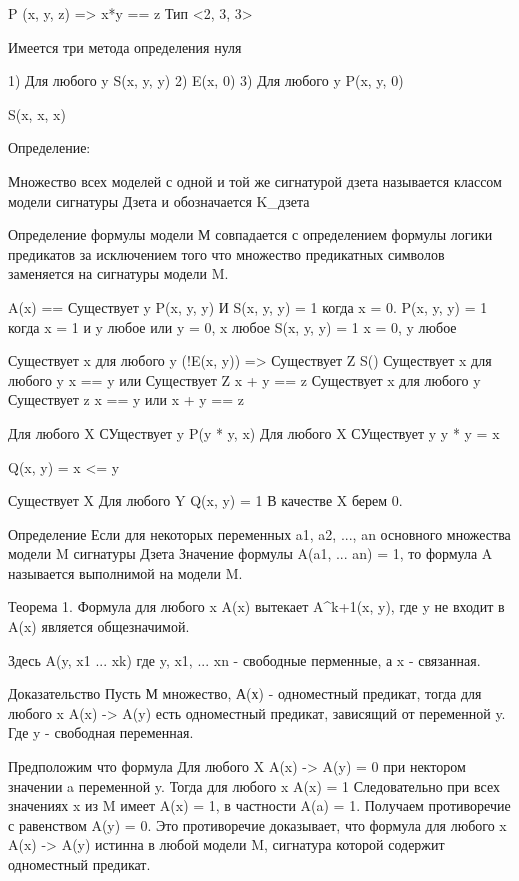 P (x, y, z) => x*y == z
 Тип <2, 3, 3>

 Имеется три метода определения нуля

 1) Для любого y S(x, y, y)
 2) E(x, 0)
 3) Для любого y P(x, y, 0)

 S(x, x, x)

 Определение:

 Множество всех моделей с одной и той же сигнатурой дзета называется классом модели сигнатуры Дзета и обозначается K_{дзета}

 Определение формулы модели М совпадается с определением формулы логики предикатов за исключением того что множество предикатных символов заменяется на сигнатуры модели M.

 A(x) == Существует y P(x, y, y) И S(x, y, y)
 = 1 когда x = 0.
 P(x, y, y) = 1 { когда x = 1 и y любое } или {y = 0, x любое}
 S(x, y, y) = 1 { x = 0, y любое }

 Существует x для любого y (!E(x, y)) => Существует Z S()
 Существует x для любого y x == y или Существует Z x + y == z
 Существует x для любого y Существует z x == y или x + y == z


 Для любого X СУществует y P(y * y, x)
 Для любого X СУществует y y * y = x

 Q(x, y) = x <= y

 Существует X Для любого Y Q(x, y) = 1 В качестве X берем 0.

 Определение
 Если для некоторых переменных a1, a2, ..., an основного множества модели M сигнатуры Дзета
 Значение формулы A(a1, ... an) = 1, то формула A называется выполнимой на модели M.

 Теорема 1. Формула для любого x A(x)
 вытекает A^k+1(x, y), где y не входит в A(x) является общезначимой.

 Здесь A(y, x1 ... xk) где y, x1, ... xn - свободные перменные, а x - связанная.

 Доказательство
 Пусть М множество, А(х) - одноместный предикат, тогда для любого x A(x) -> A(y) есть одноместный предикат, зависящий от переменной y.
 Где y - свободная переменная.

 Предположим что формула Для любого X A(x) -> A(y) = 0 при нектором значении a переменной y.
 Тогда для любого x A(x) = 1
 Следовательно при всех значениях x из M имеет A(x) = 1, в частности A(a) = 1. Получаем противоречие с равенством A(y) = 0.
 Это противоречие доказывает, что формула для любого x A(x) -> A(y) истинна в любой модели M, сигнатура которой содержит одноместный предикат.


